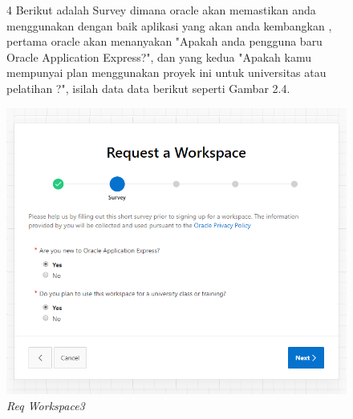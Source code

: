 \begin{itemize}
        \begin{figure}[!htbp]
        \item[4]Berikut adalah Survey dimana oracle akan memastikan anda menggunakan dengan baik aplikasi yang akan anda kembangkan , pertama oracle akan menanyakan "Apakah anda pengguna baru Oracle Application Express?", dan yang kedua "Apakah kamu mempunyai plan menggunakan proyek ini untuk universitas atau pelatihan ?", isilah data data berikut seperti Gambar 2.4.
        \begin{center}
        \includegraphics[scale=0.5]{figures/4.png}
        \caption{\textit{Req Workspace3}}
        \end{center}
        \end{figure}
        

\end{itemize}
